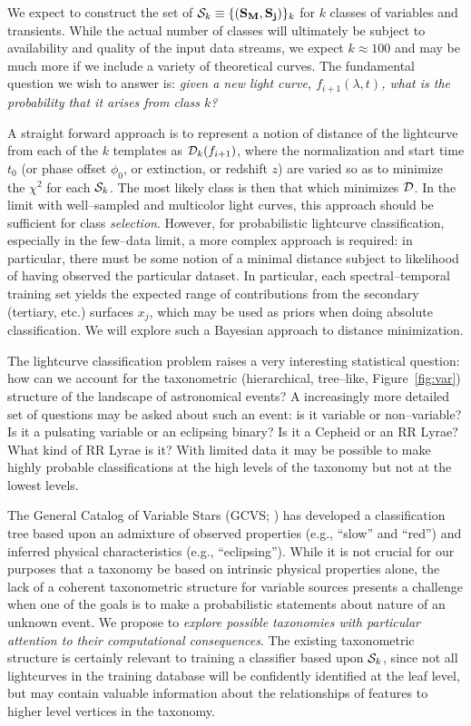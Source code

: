  \smallskip

We expect to construct the set of  ${\cal S}_k \equiv \{({\bf S_M},{\bf
S_j})\}_k$ for $k$ classes of variables and transients. While the actual number
of classes will ultimately be subject to availability and quality of the input
data streams, we expect $k \approx 100$ and may be much more if we include a
variety of theoretical curves. The fundamental question we wish to answer is:
{\it given a new light curve, $f_{i+1}(\lambda, t)$, what is the probability
that it arises from class $k$?}

A straight forward approach is to represent a notion of distance of the
lightcurve from each of the $k$ templates as ${\cal D}_k(f_{i+1})$, where the
normalization and start time $t_0$ (or phase offset $\phi_0$, or extinction, or
redshift $z$) are varied so as to minimize the $\chi^2$ for each ${\cal S}_k$.
The most likely class is then that which minimizes ${\cal D}$. In the limit with
well--sampled and multicolor light curves, this approach should be sufficient
for class {\it selection}. However, for probabilistic lightcurve classification,
especially in the few--data limit, a more complex approach is required: in
particular, there must be some notion of a minimal distance subject to
likelihood of having observed the particular dataset.  In particular, each
spectral--temporal training set yields the expected range of contributions from
the secondary (tertiary, etc.) surfaces $x_j$, which may be used as priors when
doing absolute classification. We will explore such a Bayesian approach to
distance minimization.

The lightcurve classification problem raises a very interesting statistical
question: how can we account for the taxonometric (hierarchical, tree--like,
Figure~\ref{fig:var}) structure of the landscape of astronomical events? A
increasingly more detailed set of questions may be asked about such an event: is
it variable or non--variable? Is it a pulsating variable or an eclipsing binary?
Is it a Cepheid or an RR Lyrae? What kind of RR Lyrae is it?  With limited data
it may be possible to make highly probable classifications at the high levels of
the taxonomy but not at the lowest levels.

The General Catalog of Variable Stars (GCVS; \citealt{ksf+96}) has developed a
classification tree based upon an admixture of observed properties (e.g.,
``slow'' and ``red'') and inferred physical characteristics (e.g.,
``eclipsing'').  While it is not crucial for our purposes that a taxonomy be
based on intrinsic physical properties alone, the lack of a coherent
taxonometric structure for variable sources presents a challenge when one of the
goals is to make a probabilistic statements about nature of an unknown event. We
propose to {\it explore possible taxonomies with particular attention to their
computational consequences}.  The existing taxonometric structure is certainly
relevant to training a classifier based upon ${\cal S}_k$, since not all
lightcurves in the training database will be confidently identified at the leaf
level, but may contain valuable information about the relationships of features
to higher level vertices in the taxonomy.

